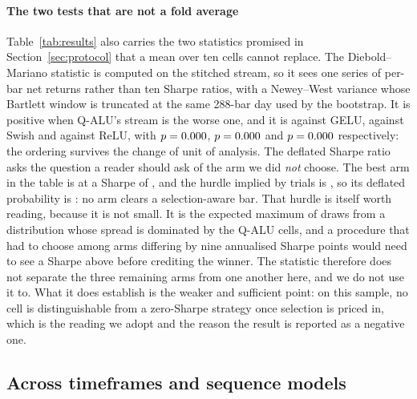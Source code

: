 \documentclass[conference]{IEEEtran}
\begin{document}
\paragraph{The two tests that are not a fold average}
Table~\ref{tab:results} also carries the two statistics promised in
Section~\ref{sec:protocol} that a mean over ten cells cannot replace. The
Diebold--Mariano statistic is computed on the stitched stream, so it sees one
series of per-bar net returns rather than ten Sharpe ratios, with a Newey--West
variance whose Bartlett window is truncated at the same 288-bar day used by the
bootstrap. It is positive when Q-ALU's stream is the worse one, and it is
\dmStatGelu{} against GELU, \dmStatSwish{} against Swish and \dmStatRelu{}
against ReLU, with $p=0.000$, $p=0.000$ and $p=0.000$ respectively: the
ordering survives the change of unit of analysis. The deflated Sharpe ratio asks
the question a reader should ask of the arm we did \emph{not} choose. The best
arm in the table is \dsrBestArm{} at a Sharpe of \dsrBestSharpe, and the hurdle
implied by \dsrTrials{} trials is \dsrBestHurdle{}, so its deflated probability
is \dsrBestValue: no arm clears a selection-aware bar. That hurdle is itself
worth reading, because it is not small. It is the expected maximum of
\dsrTrials{} draws from a distribution whose spread is dominated by the Q-ALU
cells, and a procedure that had to choose among arms differing by nine
annualised Sharpe points would need to see a Sharpe above \dsrBestHurdle{} before
crediting the winner. The statistic therefore does not separate the three
remaining arms from one another here, and we do not use it to. What it does
establish is the weaker and sufficient point: on this sample, no cell is
distinguishable from a zero-Sharpe strategy once selection is priced in, which is
the reading we adopt and the reason the result is reported as a negative one.

\subsection{Across timeframes and sequence models}

\end{document}
